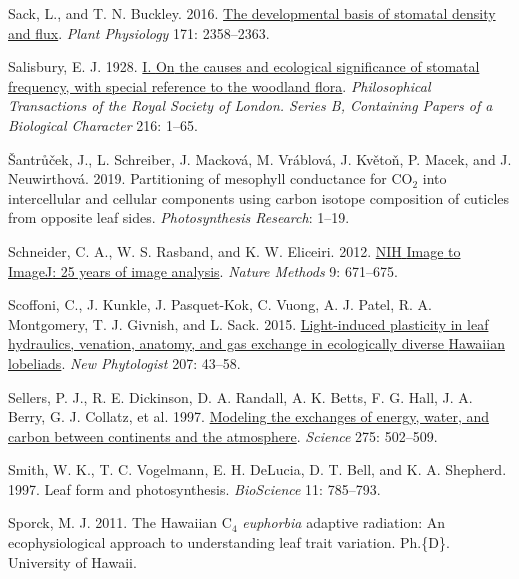 \documentclass[
  letterpaper,
  DIV=11,
  numbers=noendperiod]{scrartcl}
\newlength{\cslhangindent}
\newlength{\cslentryspacingunit} %
\newenvironment{CSLReferences}[2] %
 {%
  \setlength{\parindent}{0pt}
  \ifodd #1
  \let\oldpar\par
  \def\par{\hangindent=\cslhangindent\oldpar}
  \fi
  \setlength{\parskip}{#2\cslentryspacingunit}
 }%
 {}
\begin{document}
\begin{CSLReferences}{1}{0}
\leavevmode{}%
Sack, L., and T. N. Buckley. 2016.
\href{https://doi.org/10.1104/pp.16.00476}{The developmental basis of
stomatal density and flux}. \emph{Plant Physiology} 171: 2358--2363.

\leavevmode{}%
Salisbury, E. J. 1928. \href{https://doi.org/10.1098/rstb.1928.0001}{I.
{On} the causes and ecological significance of stomatal frequency, with
special reference to the woodland flora}. \emph{Philosophical
Transactions of the Royal Society of London. Series B, Containing Papers
of a Biological Character} 216: 1--65.

\leavevmode{}%
Šantrůček, J., L. Schreiber, J. Macková, M. Vráblová, J. Květoň, P.
Macek, and J. Neuwirthová. 2019. Partitioning of mesophyll conductance
for {CO}\(_{\textrm{2}}\) into intercellular and cellular components
using carbon isotope composition of cuticles from opposite leaf sides.
\emph{Photosynthesis Research}: 1--19.

\leavevmode{}%
Schneider, C. A., W. S. Rasband, and K. W. Eliceiri. 2012.
\href{https://doi.org/10.1038/nmeth.2089}{{NIH} {Image} to {ImageJ}: 25
years of image analysis}. \emph{Nature Methods} 9: 671--675.

\leavevmode{}%
Scoffoni, C., J. Kunkle, J. Pasquet-Kok, C. Vuong, A. J. Patel, R. A.
Montgomery, T. J. Givnish, and L. Sack. 2015.
\href{https://doi.org/10.1111/nph.13346}{Light-induced plasticity in
leaf hydraulics, venation, anatomy, and gas exchange in ecologically
diverse {Hawaiian} lobeliads}. \emph{New Phytologist} 207: 43--58.

\leavevmode{}%
Sellers, P. J., R. E. Dickinson, D. A. Randall, A. K. Betts, F. G. Hall,
J. A. Berry, G. J. Collatz, et al. 1997.
\href{https://doi.org/10.1126/science.275.5299.502}{Modeling the
exchanges of energy, water, and carbon between continents and the
atmosphere}. \emph{Science} 275: 502--509.

\leavevmode{}%
Smith, W. K., T. C. Vogelmann, E. H. DeLucia, D. T. Bell, and K. A.
Shepherd. 1997. Leaf form and photosynthesis. \emph{BioScience} 11:
785--793.

\leavevmode{}%
Sporck, M. J. 2011. The {Hawaiian} {C}\(_{\textrm{4}}\) \emph{euphorbia}
adaptive radiation: An ecophysiological approach to understanding leaf
trait variation. Ph.\{D\}. University of Hawaii.


\end{CSLReferences}
\end{document}

